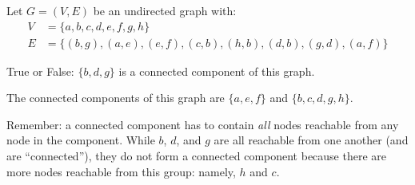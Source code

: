 \Needspace{2in}
\begin{prob}

    Let $G = (V,E)$ be an undirected graph with:
    \begin{align*}
        V &= \{a, b, c, d, e, f, g, h\} \\
        E &= \{ (b, g), (a,e), (e, f), (c, b), (h, b), (d,b), (g,d), (a,f)\}
    \end{align*}

    True or False: $\{b, d, g\}$ is a connected component of this graph.

    \tF{}

    \begin{soln}
        The connected components of this graph are $\{a, e, f\}$ and $\{b, c, d, g, h\}$.

        Remember: a connected component has to contain \emph{all} nodes reachable
        from any node in the component.
        While $b$, $d$, and $g$ are all reachable from one another (and are
        ``connected''), they do not form a connected component because there
        are more nodes reachable from this group: namely, $h$ and $c$.
    \end{soln}

\end{prob}
